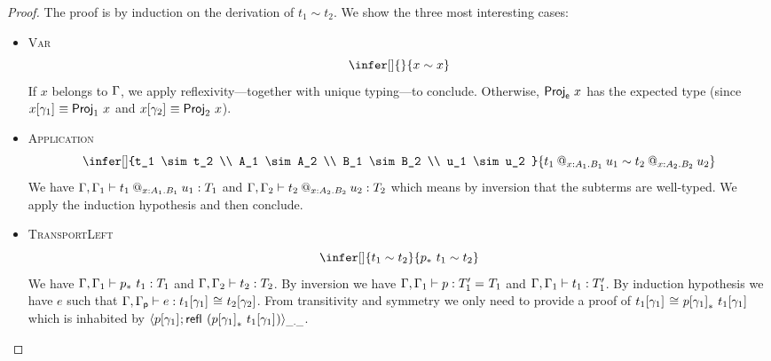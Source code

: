 \begin{proof}
  The proof is by induction on the derivation of $t_1 \sim t_2$. We show
  the three most interesting cases:

  \begin{itemize}
  \item \textsc{Var}
    \[
      \infer[]
        { }
        {x \sim x}
    \]
    If $x$ belongs to $\Ga$, we apply reflexivity---together with unique
    typing---to conclude.
    Otherwise, $\ProjE{x}$ has the expected type (since
    $\llift{\gamma}{}{x} \equiv \ProjO{x}$ and $\rlift{\gamma}{}{x} \equiv \ProjT{x}$).

  \item \textsc{Application}
    \[
      \infer[]
        {t_1 \sim t_2 \\
         A_1 \sim A_2 \\
         B_1 \sim B_2 \\
         u_1 \sim u_2
        }
        {\app{t_1}{x:A_1}{B_1}{u_1} \sim \app{t_2}{x:A_2}{B_2}{u_2}}
    \]
    We have $\isterm{\Ga, \Ga_1}{\app{t_1}{x:A_1}{B_1}{u_1}}{T_1}$ and
    $\isterm{\Ga, \Ga_2}{\app{t_2}{x:A_2}{B_2}{u_2}}{T_2}$ which means by
    inversion that the subterms are
    well-typed.
    We apply the induction hypothesis and then conclude.
  \item \textsc{TransportLeft}
    \[
      \infer[]
        {t_1 \sim t_2}
        {\transpo{p}\ t_1 \sim t_2}
    \]
    We have $\isterm{\Ga, \Ga_1}{\transpo{p}\ t_1}{T_1}$ and
    $\isterm{\Ga, \Ga_2}{t_2}{T_2}$.
    By inversion we have
    $\isterm{\Ga, \Ga_1}{p}{\Eq{}{T_1'}{T_1}}$ and
    $\isterm{\Ga, \Ga_1}{t_1}{T_1'}$.
    By induction hypothesis we have $e$ such that
    $\isterm{\Ga, \Gp}{e}{\Heq{}{\llift{\gamma}{}{t_1}}{}{\rlift{\gamma}{}{t_2}}}$.
    From transitivity and symmetry we only need to provide a proof of
    $\Heq{}{\llift{\gamma}{}{t_1}}{}{\transpo{\llift{\gamma}{}{p}}\ \llift{\gamma}{}{t_1}}$ which is inhabited by
    $\pair{\_}{\_}{\llift{\gamma}{}{p}}{\refl{} (\transpo{\llift{\gamma}{}{p}}\ \llift{\gamma}{}{t_1})}$.
  \end{itemize}
\end{proof}

